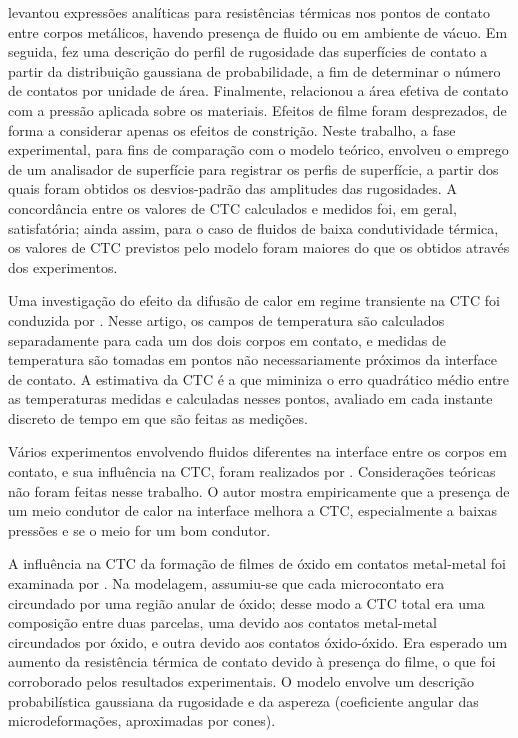 \cite{tese_mikic} levantou expressões analíticas para resistências térmicas nos pontos de contato entre corpos metálicos, havendo presença de
fluido ou em ambiente de vácuo. Em seguida, fez uma descrição do perfil de rugosidade das superfícies de contato
a partir da distribuição gaussiana de probabilidade, a fim de determinar o número de contatos por unidade de área. Finalmente, relacionou a área efetiva de 
contato com a pressão aplicada sobre os materiais. Efeitos de filme foram desprezados, de forma a considerar apenas os efeitos de constrição.
Neste trabalho, a fase experimental, para fins de comparação com o modelo teórico, envolveu o emprego de um analisador de superfície para registrar os perfis de superfície, a partir dos quais foram obtidos
os desvios-padrão das amplitudes das rugosidades. A concordância entre os valores de CTC calculados e medidos foi, em geral, satisfatória; ainda assim,
para o caso de fluidos de baixa condutividade térmica, os valores de CTC previstos pelo modelo foram maiores do que os obtidos através dos experimentos. 

Uma investigação do efeito da difusão de calor em regime transiente na CTC foi conduzida por \cite{artigo_beck}. Nesse artigo, os campos de temperatura são
calculados separadamente para cada um dos dois corpos em contato, e medidas de temperatura são tomadas em pontos não necessariamente próximos da interface
de contato. A estimativa da CTC é a que miminiza o erro quadrático médio entre as temperaturas medidas e calculadas nesses pontos, avaliado em cada instante
discreto de tempo em que são feitas as medições.

Vários experimentos envolvendo fluidos diferentes na interface entre os corpos em contato, e sua influência na CTC, foram realizados por \cite{artigo_madhusudana}.
Considerações teóricas não foram feitas nesse trabalho. O autor mostra empiricamente que a presença de um meio condutor de calor na interface melhora a CTC,
especialmente a baixas pressões e se o meio for um bom condutor.   

A influência na CTC da formação de filmes de óxido em contatos metal-metal foi examinada por \cite{artigo_astrabadi}. Na modelagem, assumiu-se
que cada microcontato era circundado por uma região anular de óxido; desse modo a CTC total era uma composição entre duas parcelas, uma devido
aos contatos metal-metal circundados por óxido, e outra devido aos contatos óxido-óxido. Era esperado um aumento da resistência térmica de contato
devido à presença do filme, o que foi corroborado pelos resultados experimentais. O modelo envolve um descrição probabilística gaussiana da rugosidade e
da aspereza (coeficiente angular das microdeformações, aproximadas por cones).

